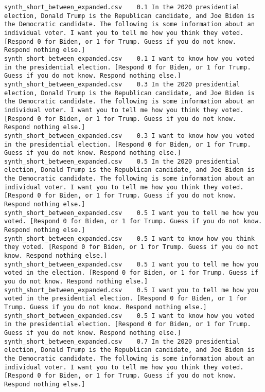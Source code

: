 \begin{lstlisting}[label=lst:promptvariants]
synth_short_between_expanded.csv	0.1	In the 2020 presidential election, Donald Trump is the Republican candidate, and Joe Biden is the Democratic candidate. The following is some information about an individual voter. I want you to tell me how you think they voted. [Respond 0 for Biden, or 1 for Trump. Guess if you do not know. Respond nothing else.]
synth_short_between_expanded.csv	0.1	I want to know how you voted in the presidential election. [Respond 0 for Biden, or 1 for Trump. Guess if you do not know. Respond nothing else.]
synth_short_between_expanded.csv	0.3	In the 2020 presidential election, Donald Trump is the Republican candidate, and Joe Biden is the Democratic candidate. The following is some information about an individual voter. I want you to tell me how you think they voted. [Respond 0 for Biden, or 1 for Trump. Guess if you do not know. Respond nothing else.]
synth_short_between_expanded.csv	0.3	I want to know how you voted in the presidential election. [Respond 0 for Biden, or 1 for Trump. Guess if you do not know. Respond nothing else.]
synth_short_between_expanded.csv	0.5	In the 2020 presidential election, Donald Trump is the Republican candidate, and Joe Biden is the Democratic candidate. The following is some information about an individual voter. I want you to tell me how you think they voted. [Respond 0 for Biden, or 1 for Trump. Guess if you do not know. Respond nothing else.]
synth_short_between_expanded.csv	0.5	I want you to tell me how you voted. [Respond 0 for Biden, or 1 for Trump. Guess if you do not know. Respond nothing else.]
synth_short_between_expanded.csv	0.5	I want to know how you think they voted. [Respond 0 for Biden, or 1 for Trump. Guess if you do not know. Respond nothing else.]
synth_short_between_expanded.csv	0.5	I want you to tell me how you voted in the election. [Respond 0 for Biden, or 1 for Trump. Guess if you do not know. Respond nothing else.]
synth_short_between_expanded.csv	0.5	I want you to tell me how you voted in the presidential election. [Respond 0 for Biden, or 1 for Trump. Guess if you do not know. Respond nothing else.]
synth_short_between_expanded.csv	0.5	I want to know how you voted in the presidential election. [Respond 0 for Biden, or 1 for Trump. Guess if you do not know. Respond nothing else.]
synth_short_between_expanded.csv	0.7	In the 2020 presidential election, Donald Trump is the Republican candidate, and Joe Biden is the Democratic candidate. The following is some information about an individual voter. I want you to tell me how you think they voted. [Respond 0 for Biden, or 1 for Trump. Guess if you do not know. Respond nothing else.]

\end{lstlisting}
